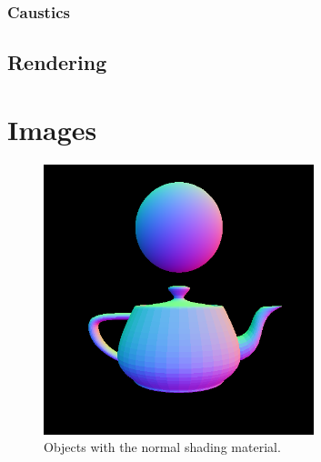 \documentclass[a4paper]{article}
\begin{document}
\subsubsection{Caustics}

\subsection{Rendering}

\pagebreak
\printbibliography
\pagebreak
\appendix
\section{Images}


\begin{figure}[h]
    \centering
    \includegraphics[width = 0.7\textwidth]{images/normalshading.png}
    \caption{Objects with the normal shading material.}\label{fig:normalshading}
\end{figure}
\end{document}
